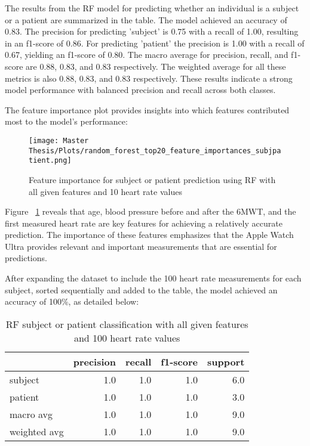 The results from the RF model for predicting whether an individual is a subject or a patient are summarized in the table. The model achieved an accuracy of 0.83. The precision for predicting 'subject' is 0.75 with a recall of 1.00, resulting in an f1-score of 0.86. For predicting 'patient' the precision is 1.00 with a recall of 0.67, yielding an f1-score of 0.80. The macro average for precision, recall, and f1-score are 0.88, 0.83, and 0.83 respectively. The weighted average for all these metrics is also 0.88, 0.83, and 0.83 respectively. These results indicate a strong model performance with balanced precision and recall across both classes.

The feature importance plot provides insights into which features contributed most to the model's performance:

\FloatBarrier
\begin{figure}[h!]
    \centering
    \texttt{[image: Master Thesis/Plots/random\_forest\_top20\_feature\_importances\_subjpatient.png]}
    \caption{Feature importance for subject or patient prediction using RF with all given features and 10 heart rate values}
    \label{fig:featureimportanceRFsubpat10}
\end{figure}
\FloatBarrier

Figure ~\ref{fig:featureimportanceRFsubpat10} reveals that age, blood pressure before and after the 6MWT, and the first measured heart rate are key features for achieving a relatively accurate prediction. The importance of these features emphasizes that the Apple Watch Ultra provides relevant and important measurements that are essential for predictions.

After expanding the dataset to include the 100 heart rate measurements for each subject, sorted sequentially and added to the table, the model achieved an accuracy of 100\%, as detailed below:

\begin{table}[H]
\centering
\begin{tabular}{lrrrr}
\toprule
{} &  precision &  recall &  f1-score &  support \\
\midrule
subject            &        1.0 &     1.0 &       1.0 &      6.0 \\
patient            &        1.0 &     1.0 &       1.0 &      3.0 \\
macro avg    &        1.0 &     1.0 &       1.0 &      9.0 \\
weighted avg &        1.0 &     1.0 &       1.0 &      9.0 \\
\bottomrule
\end{tabular}
\caption{RF subject or patient classification with all given features and 100 heart rate values}
\label{table:featureimportanceRFsubpat100}
\end{table}

